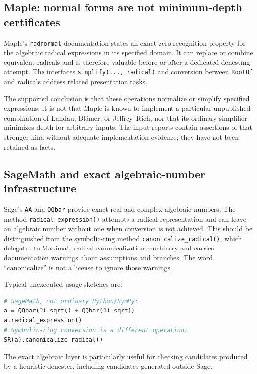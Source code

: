 \documentclass[11pt,a4paper]{article}
\theoremstyle{definition}
\theoremstyle{remark}
\numberwithin{equation}{section}
\begin{document}
\subsection{Maple: normal forms are not minimum-depth certificates}

Maple's \texttt{radnormal} documentation states an exact zero-recognition property for the algebraic radical expressions in its specified domain. It can replace or combine equivalent radicals and is therefore valuable before or after a dedicated denesting attempt. The interfaces \texttt{simplify(..., radical)} and conversion between \texttt{RootOf} and radicals address related presentation tasks.\cite{mapleradnormal,mapleradical}

The supported conclusion is that these operations normalize or simplify specified expressions. It is not that Maple is known to implement a particular unpublished combination of Landau, Bl\"omer, or Jeffrey--Rich, nor that its ordinary simplifier minimizes depth for arbitrary inputs. The input reports contain assertions of that stronger kind without adequate implementation evidence; they have not been retained as facts.

\subsection{SageMath and exact algebraic-number infrastructure}

Sage's \texttt{AA} and \texttt{QQbar} provide exact real and complex algebraic numbers. The method \texttt{radical\_expression()} attempts a radical representation and can leave an algebraic number without one when conversion is not achieved. This should be distinguished from the symbolic-ring method \texttt{canonicalize\_radical()}, which delegates to Maxima's radical canonicalization machinery and carries documentation warnings about assumptions and branches. The word ``canonicalize'' is not a license to ignore those warnings.\cite{sageqqbar,sageexpression}

Typical unexecuted usage sketches are:
\begin{lstlisting}[language=Python]
# SageMath, not ordinary Python/SymPy:
a = QQbar(2).sqrt() + QQbar(3).sqrt()
a.radical_expression()
# Symbolic-ring conversion is a different operation:
SR(a).canonicalize_radical()
\end{lstlisting}
The exact algebraic layer is particularly useful for checking candidates produced by a heuristic denester, including candidates generated outside Sage.
\end{document}
